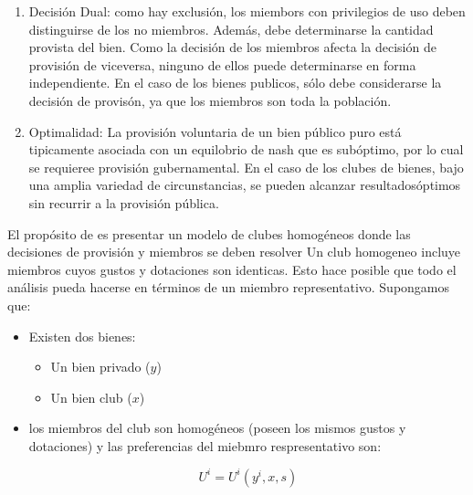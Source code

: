 \begin{enumerate}
\begin{enumerate}
	 \item Decisión Dual: como hay exclusión, los miembors con privilegios de uso deben distinguirse de los no miembros. Además, debe determinarse la cantidad provista del bien. Como la decisión de los miembros afecta la decisión de provisión de viceversa, ninguno de ellos puede determinarse en forma independiente. En el caso de los bienes publicos, sólo debe considerarse la decisión de provisón, ya que los miembros son toda la población.
	 \item Optimalidad: La provisión voluntaria de un bien público puro está tipicamente asociada con un equilobrio de nash que es subóptimo, por lo cual se requieree provisión gubernamental. En el caso de los clubes de bienes, bajo una amplia variedad de circunstancias, se pueden alcanzar resultadosóptimos sin recurrir a la provisión pública.
\end{enumerate}

El propósito de \cite{Cornes_Sandler_1986} es presentar un modelo de clubes homogéneos donde las decisiones de provisión y miembros se deben resolver 
Un club homogeneo incluye miembros cuyos gustos y dotaciones son identicas. Esto hace posible que todo el análisis pueda hacerse en términos de un miembro representativo.
Supongamos que:
\begin{itemize}
	 \item Existen dos bienes: 
	 \begin{itemize}
	 	\item Un bien privado ($y$) 
	 	\item Un bien club ($x$)
	 \end{itemize}
	 \item los miembros del club son homogéneos (poseen los mismos gustos y dotaciones) y las preferencias del miebmro respresentativo son: 
	
	 $$ U^i=U^i(y^i, x,s)$$


\end{itemize}
\end{enumerate}
